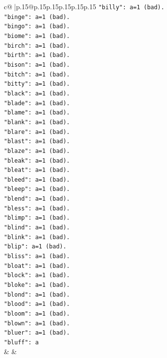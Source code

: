 \documentclass{article}
\begin{document}
{\begin{supertabular}{c@{$\;$}|p{.15\linewidth}@{}p{.15\linewidth}p{.15\linewidth}p{.15\linewidth}p{.15\linewidth}p{.15\linewidth}}
{{{\texttt{"billy": a=1 (bad).} \\
\texttt{"binge": a=1 (bad).} \\
\texttt{"bingo": a=1 (bad).} \\
\texttt{"biome": a=1 (bad).} \\
\texttt{"birch": a=1 (bad).} \\
\texttt{"birth": a=1 (bad).} \\
\texttt{"bison": a=1 (bad).} \\
\texttt{"bitch": a=1 (bad).} \\
\texttt{"bitty": a=1 (bad).} \\
\texttt{"black": a=1 (bad).} \\
\texttt{"blade": a=1 (bad).} \\
\texttt{"blame": a=1 (bad).} \\
\texttt{"blank": a=1 (bad).} \\
\texttt{"blare": a=1 (bad).} \\
\texttt{"blast": a=1 (bad).} \\
\texttt{"blaze": a=1 (bad).} \\
\texttt{"bleak": a=1 (bad).} \\
\texttt{"bleat": a=1 (bad).} \\
\texttt{"bleed": a=1 (bad).} \\
\texttt{"bleep": a=1 (bad).} \\
\texttt{"blend": a=1 (bad).} \\
\texttt{"bless": a=1 (bad).} \\
\texttt{"blimp": a=1 (bad).} \\
\texttt{"blind": a=1 (bad).} \\
\texttt{"blink": a=1 (bad).} \\
\texttt{"blip": a=1 (bad).} \\
\texttt{"bliss": a=1 (bad).} \\
\texttt{"bloat": a=1 (bad).} \\
\texttt{"block": a=1 (bad).} \\
\texttt{"bloke": a=1 (bad).} \\
\texttt{"blond": a=1 (bad).} \\
\texttt{"blood": a=1 (bad).} \\
\texttt{"bloom": a=1 (bad).} \\
\texttt{"blown": a=1 (bad).} \\
\texttt{"bluer": a=1 (bad).} \\
\texttt{"bluff": a} \\
            }
        }
    }
    & & \\ \\


\end{supertabular}}
\end{document}
